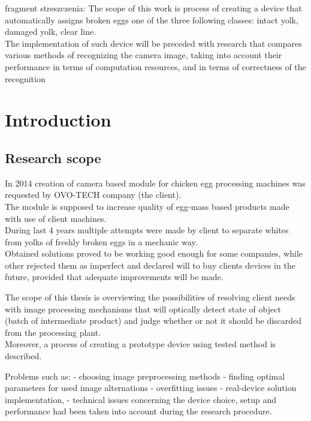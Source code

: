\documentclass[12pt,twoside,a4paper]{article}
\begin{document}
\tableofcontents

fragment streszczenia:
The scope of this work is process of creating a device that automatically assigns broken eggs one of the three following classes: intact yolk, damaged yolk, clear line.\\
The implementation of such device will be preceded with research that compares various methods of recognizing the camera image, taking into account their performance in terms of computation resources, and in terms of correctness of the recognition

\section{Introduction}
\subsection{Research scope}
In 2014 creation of  camera based  module for chicken egg processing machines was requested by OVO-TECH company (the client).\\
The module is supposed to increase quality of egg-mass based  products made with use of  client machines.\\

During last 4 years multiple attempts were made by client to separate whites from yolks of freshly broken eggs in a mechanic way.\\ 
Obtained solutions proved to be working good enough for some companies, while other rejected them as imperfect and declared will to buy clients devices in the future, provided that adequate improvements will be made.

The scope of this thesis is overviewing the possibilities of resolving client needs with image processing mechanisms that will optically detect state of object (batch of  intermediate product) and judge whether or not it should be discarded from the processing plant.\\
Moreover, a process of creating a prototype device using tested method  is described.

Problems such as:
- choosing image preprocessing methods
- finding optimal  parameters for used image alternations
- overfitting issues
- real-device solution implementation, 
- technical issues concerning the device choice, setup and performance 
had been taken  into account during the research procedure.
\end{document}
